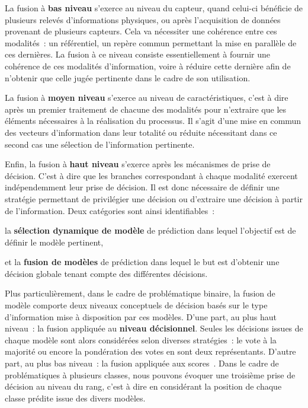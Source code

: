 La fusion à \textbf{bas niveau} s'exerce au niveau du capteur, quand celui-ci bénéficie de plusieurs relevés d'informations physiques, ou après l'acquisition de données provenant de plusieurs capteurs. Cela va nécessiter une cohérence entre ces modalités~: un référentiel, un repère commun permettant la mise en parallèle de ces dernières. La fusion à ce niveau consiste essentiellement à fournir une cohérence de ces modalités d'information, voire à réduire cette dernière afin de n'obtenir que celle jugée pertinente dans le cadre de son utilisation.\par

La fusion à \textbf{moyen niveau} s'exerce au niveau de caractéristiques, c'est à dire après un premier traitement de chacune des modalités pour n'extraire que les éléments nécessaires à la réalisation du processus. Il s'agit d'une mise en commun des vecteurs d'information dans leur totalité ou réduite nécessitant dans ce second cas une sélection de l'information pertinente.\par

Enfin, la fusion à \textbf{haut niveau} s'exerce après les mécanismes de prise de décision. C'est à dire que les branches correspondant à chaque modalité exercent indépendemment leur prise de décision. Il est donc nécessaire de définir une stratégie permettant de privilégier une décision ou d'extraire une décision à partir de l'information. Deux catégories sont ainsi identifiables~: 
\begin{inlinerate}
    \item la \textbf{sélection dynamique de modèle} de prédiction dans lequel l'objectif est de définir le modèle pertinent,
    \item et la \textbf{fusion de modèles} de prédiction dans lequel le but est d'obtenir une décision globale tenant compte des différentes décisions.
\end{inlinerate}\par

Plus particulièrement, dans le cadre de problématique binaire, la fusion de modèle comporte deux niveaux conceptuels de décision basés sur le type d'information mise à disposition par ces modèles. D'une part, au plus haut niveau~: la fusion appliquée au \textbf{niveau décisionnel}. Seules les décisions issues de chaque modèle sont alors considérées selon diverses stratégies~: le vote à la majorité ou encore la pondération des votes en sont deux représentants. D'autre part, au plus bas niveau~: la fusion appliquée aux scores~\cite{Kittler1998}. Dans le cadre de problématiques à plusieurs classes, nous pouvons évoquer une troisième prise de décision au niveau du rang, c'est à dire en considérant la position de chaque classe prédite issue des divers modèles.\par


